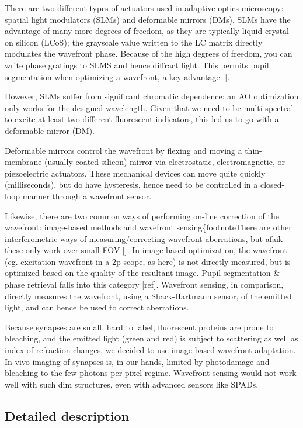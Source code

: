 \documentclass[a4paper,12pt]{article}
\begin{document}
There are two different types of actuators used in adaptive optics microscopy: spatial light modulators (SLMs) and deformable mirrors (DMs).  SLMs have the advantage of many more degrees of freedom, as they are typically liquid-crystal on silicon (LCoS); the grayscale value written to the LC matrix directly modulates the wavefront phase.  Because of the high degrees of freedom, you can write phase gratings to SLMS and hence diffract light.  This permits pupil segmentation when optimizing a wavefront, a key advantage [].  

However, SLMs suffer from significant chromatic dependence: an AO optimization only works for the designed wavelength.  Given that we need to be multi-spectral to excite at least two different fluorescent indicators, this led us to go with a deformable mirror (DM). 

Deformable mirrors control the wavefront by flexing and moving a thin-membrane (usually coated silicon) mirror via electrostatic, electromagnetic, or piezoelectric actuators.  These mechanical devices can move quite quickly (milliseconds), but do have hysteresis, hence need to be controlled in a closed-loop manner through a wavefront sensor.  

Likewise, there are two common ways of performing on-line correction of the wavefront: image-based methods and wavefront sensing\{footnote{There are other interferometric ways of measuring/correcting wavefront aberrations, but afaik these only work over small FOV []}.  In image-based optimization, the wavefront (eg. excitation wavefront in a 2p scope, as here) is not directly measured, but is optimized based on the quality of the resultant image.  Pupil segmentation \& phase retrieval falls into this category [ref].  Wavefront sensing, in comparison, directly measures the wavefront, using a Shack-Hartmann sensor, of the emitted light, and can hence be used to correct aberrations.  

Because synapses are small, hard to label, fluorescent proteins are prone to bleaching, and the emitted light (green and red) is subject to scattering as well as index of refraction changes, we decided to use image-based wavefront adaptation.  In-vivo imaging of synapses is, in our hands, limited by photodamage and bleaching to the few-photons per pixel regime.  Wavefront sensing would not work well with such dim structures, even with advanced sensors like SPADs.  

\subsection{Detailed description}
\end{document}
